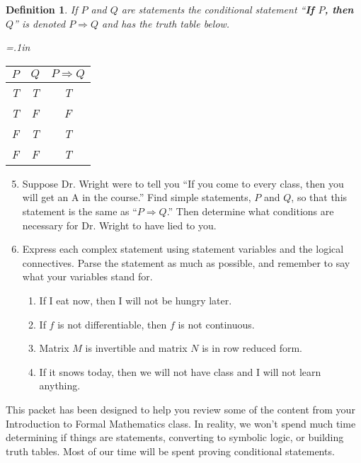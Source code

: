 \documentclass[12 pt]{article}
\theoremstyle{definition}
\theoremstyle{plain}
\theoremstyle{mytheorem}
\theoremstyle{myexample}
\theoremstyle{mydefinition}
\newtheorem{definition}{Definition}
\begin{document}
\begin{definition}  If $P$ and $Q$ are statements the conditional statement ``\textbf{If $P$, then $Q$}'' is denoted $P \Rightarrow Q$ and has the truth table below.
	\begin{center}
	{\tabulinesep=.1in
	\begin{tabu}{|cc|c|}
	\hline
	$P$ & $Q$ & $ P \Rightarrow Q$ \\
	\hline
	T & T & T\\
	T & F & F\\
	F & T & T\\
	F & F & T\\
	\hline
	\end{tabu}}
	\end{center}
\end{definition}

\begin{enumerate}
\setcounter{enumi}{4}
\item Suppose Dr. Wright were to tell you ``If you come to every class, then you will get an A in the course.''  Find simple statements, $P$ and $Q$, so that this statement is the same as ``$P \Rightarrow Q$.'' Then determine what conditions are necessary for Dr. Wright to have lied to you.

\vspace{2in}

\item Express each complex statement using statement variables and the logical connectives.  Parse the statement as much as possible, and remember to say what your variables stand for.
	\begin{enumerate}
	\item If I eat now, then I will not be hungry later.
	
	\vspace{1in}
	
	\item If $f$ is not differentiable, then $f$ is not continuous.
	
	\vspace{1in}
	
	\item Matrix $M$ is invertible and matrix $N$ is in row reduced form.
	
	\vspace{1in}
	
	\item If it snows today, then we will not have class and I will not learn anything.
	
	\vspace{1in}
	\end{enumerate}
\end{enumerate}

This packet has been designed to help you review some of the content from your Introduction to Formal Mathematics class.  In reality, we won't spend much time determining if things are statements, converting to symbolic logic, or building truth tables.  Most of our time will be spent proving conditional statements.    
\end{document}

